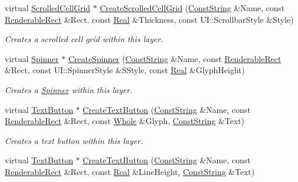 \begin{DoxyCompactItemize}
virtual \hyperlink{classphys_1_1UI_1_1ScrolledCellGrid}{ScrolledCellGrid} $\ast$ \hyperlink{classphys_1_1UI_1_1Layer_a967b2ff1bcc006a909b623325182da4a}{CreateScrolledCellGrid} (\hyperlink{namespacephys_a5ce5049f8b4bf88d6413c47b504ebb31}{ConstString} \&Name, const \hyperlink{structphys_1_1UI_1_1RenderableRect}{RenderableRect} \&Rect, const \hyperlink{namespacephys_af7eb897198d265b8e868f45240230d5f}{Real} \&Thickness, const UI::ScrollbarStyle \&Style)
\begin{DoxyCompactList}\small\item\em Creates a scrolled cell grid within this layer. \item\end{DoxyCompactList}\item 
virtual \hyperlink{classphys_1_1UI_1_1Spinner}{Spinner} $\ast$ \hyperlink{classphys_1_1UI_1_1Layer_aaa21b066649965bec3b992b92fe0eeb7}{CreateSpinner} (\hyperlink{namespacephys_a5ce5049f8b4bf88d6413c47b504ebb31}{ConstString} \&Name, const \hyperlink{structphys_1_1UI_1_1RenderableRect}{RenderableRect} \&Rect, const UI::SpinnerStyle \&SStyle, const \hyperlink{namespacephys_af7eb897198d265b8e868f45240230d5f}{Real} \&GlyphHeight)
\begin{DoxyCompactList}\small\item\em Creates a \hyperlink{classphys_1_1UI_1_1Spinner}{Spinner} within this layer. \item\end{DoxyCompactList}\item 
virtual \hyperlink{classphys_1_1UI_1_1TextButton}{TextButton} $\ast$ \hyperlink{classphys_1_1UI_1_1Layer_a4a6246485351ecc9db995c749dc18f13}{CreateTextButton} (\hyperlink{namespacephys_a5ce5049f8b4bf88d6413c47b504ebb31}{ConstString} \&Name, const \hyperlink{structphys_1_1UI_1_1RenderableRect}{RenderableRect} \&Rect, const \hyperlink{namespacephys_a460f6bc24c8dd347b05e0366ae34f34a}{Whole} \&Glyph, \hyperlink{namespacephys_a5ce5049f8b4bf88d6413c47b504ebb31}{ConstString} \&Text)
\begin{DoxyCompactList}\small\item\em Creates a text button within this layer. \item\end{DoxyCompactList}\item 
virtual \hyperlink{classphys_1_1UI_1_1TextButton}{TextButton} $\ast$ \hyperlink{classphys_1_1UI_1_1Layer_ad2c0cfc59e34aeda647a7659b4522e55}{CreateTextButton} (\hyperlink{namespacephys_a5ce5049f8b4bf88d6413c47b504ebb31}{ConstString} \&Name, const \hyperlink{structphys_1_1UI_1_1RenderableRect}{RenderableRect} \&Rect, const \hyperlink{namespacephys_af7eb897198d265b8e868f45240230d5f}{Real} \&LineHeight, \hyperlink{namespacephys_a5ce5049f8b4bf88d6413c47b504ebb31}{ConstString} \&Text)

\end{DoxyCompactItemize}

